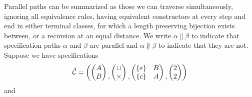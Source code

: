 Parallel paths can be summarized as those we can traverse simultaneously, ignoring all equivalence rules, having equivalent constructors at every step and end in either terminal classes, for which a length preserving bijection exists between, or a recursion at an equal distance. We write $\alpha \parallel \beta$ to indicate that specification paths $\alpha$ and $\beta$ are parallel and $\alpha \nparallel \beta$ to indicate that they are not. Suppose we have specifications
\[
    \check{\mathcal{C}} = \left(
        \begin{pmatrix}
            A\\
            B
        \end{pmatrix}
        \begin{matrix}\\,\end{matrix}
        \begin{pmatrix}
            \sqcup\\
            \times
        \end{pmatrix}
        \begin{matrix}\\,\end{matrix}
        \begin{pmatrix}
            \left\{\varepsilon\right\} & B\\
            \left\{c\right\} & A
        \end{pmatrix}
        \begin{matrix}\\,\end{matrix}
        \begin{pmatrix}
            2\\
            2
        \end{pmatrix}
    \right)
\]
and
